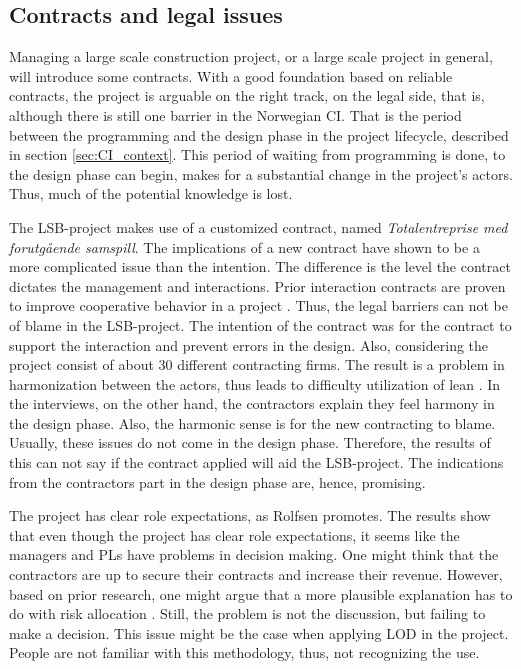 \subsection{Contracts and legal issues}
Managing a large scale construction project, or a large scale project in general, will introduce some contracts. With a good foundation based on reliable contracts, the project is arguable on the right track, on the legal side, that is, although there is still one barrier in the Norwegian CI. That is the period between the programming and the design phase in the project lifecycle, described in section \ref{sec:CI_context}. This period of waiting from programming is done, to the design phase can begin, makes for a substantial change in the project's actors. Thus, much of the potential knowledge is lost. 

The LSB-project makes use of a customized contract, named \textit{Totalentreprise med forutgående samspill}. The implications of a new contract have shown to be a more complicated issue than the intention. The difference is the level the contract dictates the management and interactions. Prior interaction contracts are proven to improve cooperative behavior in a project \cite{wang2017prior}. Thus, the legal barriers can not be of blame in the LSB-project. The intention of the contract was for the contract to support the interaction and prevent errors in the design. Also, considering the project consist of about 30 different contracting firms. The result is a problem in harmonization between the actors, thus leads to difficulty utilization of lean \cite{miller2002harmonization}. In the interviews, on the other hand, the contractors explain they feel harmony in the design phase. Also, the harmonic sense is for the new contracting to blame. Usually, these issues do not come in the design phase. Therefore, the results of this can not say if the contract applied will aid the LSB-project. The indications from the contractors part in the design phase are, hence, promising. 
    
The project has clear role expectations, as Rolfsen promotes\cite{rolfsen}. The results show that even though the project has clear role expectations, it seems like the managers and PLs have problems in decision making. One might think that the contractors are up to secure their contracts and increase their revenue. However, based on prior research, one might argue that a more plausible explanation has to do with risk allocation \cite{zaghloul2003construction}.  Still, the problem is not the discussion, but failing to make a decision. This issue might be the case when applying LOD in the project. People are not familiar with this methodology, thus, not recognizing the use. 

